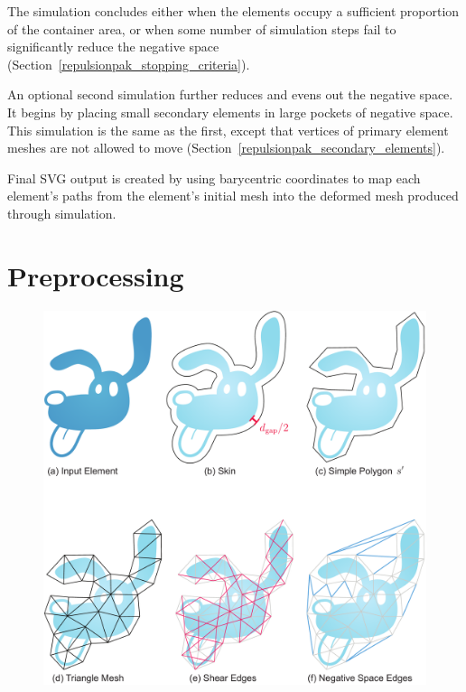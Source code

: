 The simulation concludes 
either when the elements occupy a sufficient proportion of the container area, or 
when some number of simulation steps fail to
significantly reduce the negative space
(Section~\ref{repulsionpak_stopping_criteria}).

An optional second simulation further reduces and evens out the
negative space.  It begins by placing small secondary elements in large
pockets of negative space.  This simulation is the same as the
first, except that vertices of primary element meshes are not allowed to move
(Section~\ref{repulsionpak_secondary_elements}).

Final SVG output is created by using barycentric coordinates to map each element's
paths from the element's initial mesh into the deformed mesh produced through
simulation. 


\section{Preprocessing}
\label{repulsionpak_preprocessing}

\begin{figure} %
\centering
\includegraphics[width=1.0\textwidth]{figures/repulsionpak/element_skin_triangles_4.pdf}
\caption[Element discretization]{
	\label{fig_elements_image}
}
\end{figure}






